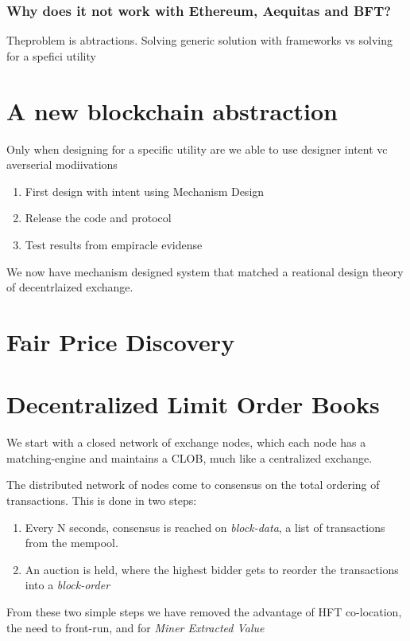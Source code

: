 \documentclass[12pt]{article}
\begin{document}
\subsubsection{Why does it not work with Ethereum, Aequitas and BFT?}
Theproblem is abtractions. Solving generic solution with frameworks vs solving for a spefici utility 

\section{A new blockchain abstraction} 
Only when designing for a specific utility are we able to use designer intent vc averserial modiivations 

\begin{enumerate}
    \item First design with intent using Mechanism Design 
    \item Release the code and protocol
    \item Test results from empiracle evidense 
\end{enumerate}

We now have mechanism designed system that matched a reational design theory of decentrlaized exchange. 

\section{Fair Price Discovery} 

\section{Decentralized Limit Order Books}
We start with a closed network of exchange nodes, which each node has a matching-engine and maintains a CLOB, much like a centralized exchange. 

The distributed network of nodes come to consensus on the total ordering of transactions. This is done in two steps: 

\begin{enumerate}
    \item Every N seconds, consensus is reached on \emph{block-data}, a list of transactions from the mempool. 
    \item An auction is held, where the highest bidder gets to reorder the transactions into a \emph{block-order}  
\end{enumerate}

From these two simple steps we have removed the advantage of HFT co-location, the need to front-run, and for \emph{Miner Extracted Value}
\end{document}
